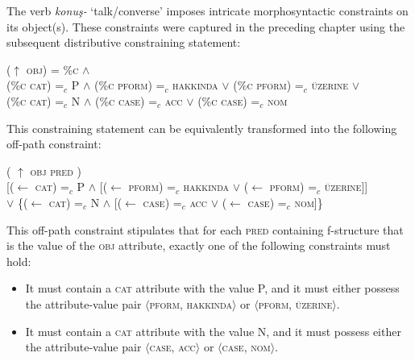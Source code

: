 The verb \textit{konuş-} `talk/converse' imposes intricate morphosyntactic constraints on its object(s). These constraints were captured in the preceding chapter using the subsequent distributive constraining statement:

\ex
\label{obj-liberal}
($\uparrow$ \textsc{obj}) = \%\textsc{c} $\land$ \\
\vspace{3pt}\text{[[}(\%\textsc{c cat}) =$_c$ P $\land$ \text{[}(\%\textsc{c pform}) =$_c$ \textsc{hakkinda} $\lor$ (\%\textsc{c pform}) =$_c$ \textsc{üzerine}\text{]]} $\lor$ \\
\text{[}(\%\textsc{c cat}) =$_c$ N $\land$ \text{[}(\%\textsc{c case}) =$_c$ \textsc{acc} $\lor$ (\%\textsc{c case}) =$_c$ \textsc{nom}\text{]]]}
\xe

This constraining statement can be equivalently transformed into the following off-path constraint:

\ex
\label{obj-conservative}
( $\uparrow$  \textsc{obj} \hspace*{12em} \textsc{pred} \hspace*{16em})
\\
\hspace*{1.5em} [($\leftarrow$ \textsc{cat}) =$_{c}$ P \hspace*{0.2em} $\land$ [($\leftarrow$ \textsc{pform}) =$_{c}$ \textsc{hakkında} $\lor$ \hspace*{0.2em} ($\leftarrow$ \textsc{pform}) =$_{c}$ \textsc{üzerine}]] \\
\hspace*{3.5em} $\lor$  \{($\leftarrow$ \textsc{cat}) =$_{c}$ N \hspace*{0.2em} $\land$ \hspace*{0.2em} [($\leftarrow$ \textsc{case}) =$_{c}$ \textsc{acc} $\lor$ ($\leftarrow$ \textsc{case}) =$_{c}$ \textsc{nom}]\} 
\xe

This off-path constraint stipulates that for each \textsc{pred} containing f-structure that is the value of the \textsc{obj} attribute, exactly one of the following constraints must hold:

\begin{sloppypar}
	\begin{itemize}
		\item It must contain a \textsc{cat} attribute with the value P, and it must either possess the attribute-value pair $\langle$\textsc{pform, hakkında}$\rangle$ or $\langle$\textsc{pform, üzerine}$\rangle$.
		\item It must contain a \textsc{cat} attribute with the value N, and it must possess either the attribute-value pair $\langle$\textsc{case, acc}$\rangle$ or $\langle$\textsc{case, nom}$\rangle$.
	\end{itemize}
\end{sloppypar}

